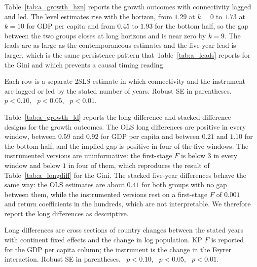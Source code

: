 Table~\ref{tab:a_growth_hzn} reports the growth outcomes with connectivity lagged and led. The level estimates rise with the horizon, from $1.29$ at $k=0$ to $1.73$ at $k=10$ for GDP per capita and from $0.45$ to $1.93$ for the bottom half, so the gap between the two groups closes at long horizons and is near zero by $k=9$. The leads are as large as the contemporaneous estimates and the five-year lead is larger, which is the same persistence pattern that Table~\ref{tab:a_leads} reports for the Gini and which prevents a causal timing reading.

\begin{table}[H]\centering\caption{Growth outcomes with lagged and led connectivity.}\label{tab:a_growth_hzn}
\begin{threeparttable}\small
\begin{tablenotes}\footnotesize\item Each row is a separate 2SLS estimate in which connectivity and the instrument are lagged or led by the stated number of years. Robust SE in parentheses. \sym{*}~$p<0.10$, \sym{**}~$p<0.05$, \sym{***}~$p<0.01$.\end{tablenotes}\end{threeparttable}\end{table}

Table~\ref{tab:a_growth_ld} reports the long-difference and stacked-difference designs for the growth outcomes. The OLS long differences are positive in every window, between $0.59$ and $0.92$ for GDP per capita and between $0.21$ and $1.10$ for the bottom half, and the implied gap is positive in four of the five windows. The instrumented versions are uninformative: the first-stage $F$ is below $3$ in every window and below $1$ in four of them, which reproduces the result of Table~\ref{tab:a_longdiff} for the Gini. The stacked five-year differences behave the same way: the OLS estimates are about $0.41$ for both groups with no gap between them, while the instrumented versions rest on a first-stage $F$ of $0.001$ and return coefficients in the hundreds, which are not interpretable. We therefore report the long differences as descriptive.

\begin{table}[H]\centering\caption{Long differences and stacked differences, growth outcomes.}\label{tab:a_growth_ld}
\begin{threeparttable}\small
\begin{tablenotes}\footnotesize\item Long differences are cross sections of country changes between the stated years with continent fixed effects and the change in log population. KP $F$ is reported for the GDP per capita column; the instrument is the change in the Feyrer interaction. Robust SE in parentheses. \sym{*}~$p<0.10$, \sym{**}~$p<0.05$, \sym{***}~$p<0.01$.\end{tablenotes}\end{threeparttable}\end{table}

